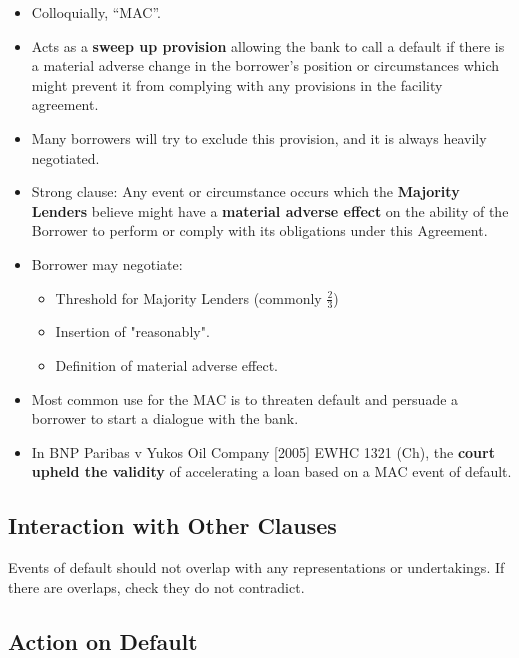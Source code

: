 \documentclass[
]{article}
\providecommand{\tightlist}{%
  \setlength{\itemsep}{0pt}\setlength{\parskip}{0pt}}
\begin{document}
\begin{itemize}
\tightlist
\item
  Colloquially, ``MAC''.
\item
  Acts as a \textbf{sweep up provision} allowing the bank to call a
  default if there is a material adverse change in the borrower's
  position or circumstances which might prevent it from complying with
  any provisions in the facility agreement.
\item
  Many borrowers will try to exclude this provision, and it is always
  heavily negotiated.
\item
  Strong clause: Any event or circumstance occurs which the
  \textbf{Majority Lenders} believe might have a \textbf{material
  adverse effect} on the ability of the Borrower to perform or comply
  with its obligations under this Agreement.
\item
  Borrower may negotiate:

  \begin{itemize}
  \tightlist
  \item
    Threshold for Majority Lenders (commonly {\(\frac{2}{3}\)})
  \item
    Insertion of "reasonably".
  \item
    Definition of material adverse effect.
  \end{itemize}
\item
  Most common use for the MAC is to threaten default and persuade a
  borrower to start a dialogue with the bank.
\item
  In BNP Paribas v Yukos Oil Company {[}2005{]} EWHC 1321 (Ch), the
  \textbf{court upheld the validity} of accelerating a loan based on a
  MAC event of default.
\end{itemize}

\hypertarget{interaction-with-other-clauses}{%
\subsection{Interaction with Other
Clauses}\label{interaction-with-other-clauses}}

Events of default should not overlap with any representations or
undertakings. If there are overlaps, check they do not contradict.

\hypertarget{action-on-default}{%
\subsection{Action on Default}\label{action-on-default}}
\end{document}
